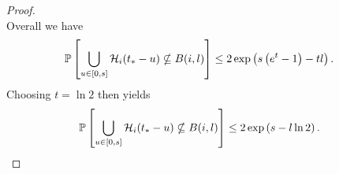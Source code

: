 \begin{proof}
\begin{equation}
		\end{equation}
		Overall we have
		\begin{align}
			\mathbb{P}\left[\bigcup_{u \in [0, s]}\mathcal{H}_i(t_* - u) \nsubseteq B(i, l)\right] &\leq 2\exp\left(s\left(e^t - 1\right) - t l\right).
		\end{align}
		Choosing $t = \ln 2$ then yields
		\begin{align}
			\prob\left[\bigcup_{u \in [0, s]}\mathcal{H}_i(t_* - u) \nsubseteq B(i, l)\right] &\leq 2\exp\left(s - l \ln 2 \right).%
		\end{align}
	\end{proof}



